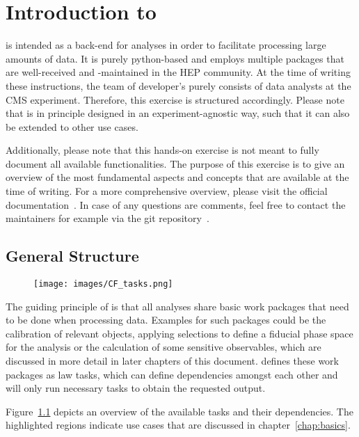 \chapter{Introduction to \columnflow}
\columnflow is intended as a back-end for analyses in order to facilitate processing large amounts of data.
It is purely python-based and employs multiple packages that are well-received and {-maintained} in the HEP community.
At the time of writing these instructions, the team of developer's purely consists of data analysts at the CMS experiment.
Therefore, this exercise is structured accordingly.
Please note that \columnflow is in principle designed in an experiment-agnostic way, such that it can also be extended to other use cases.

Additionally, please note that this hands-on exercise is not meant to fully document all available functionalities.
The purpose of this exercise is to give an overview of the most fundamental aspects and concepts that are available at the time of writing.
For a more comprehensive overview, please visit the official documentation~\cite{cf_repo}. %
In case of any questions are comments, feel free to contact the maintainers for example via the git repository~\cite{cf_repo}.

\section{General Structure}
\begin{figure}[p]
	\centering
	\texttt{[image: images/CF\_tasks.png]}
	\label{fig:task_graph}
\end{figure}

The guiding principle of \columnflow is that all analyses share basic work packages that need to be done when processing data.
Examples for such packages could be the calibration of relevant objects, applying selections to define a fiducial phase space for the analysis or the calculation of some sensitive observables, which are discussed in more detail in later chapters of this document.
\columnflow defines these work packages as law tasks, which can define dependencies amongst each other and will only run necessary tasks to obtain the requested output.


Figure~\ref{fig:task_graph} depicts an overview of the available tasks and their dependencies.
The highlighted regions indicate use cases that are discussed in chapter~\ref{chap:basics}.